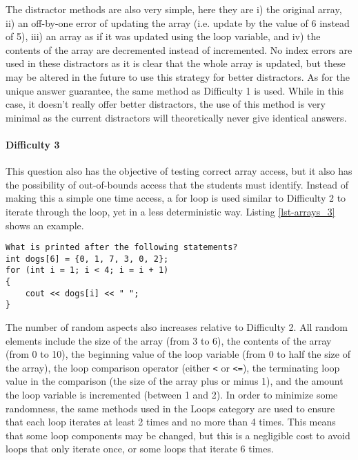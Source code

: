 \documentclass{article}
\begin{document}
The distractor methods are also very simple, here they are i) the original array, ii) an off-by-one error of updating the array (i.e. update by the value of 6 instead of 5), iii) an array as if it was
updated using the loop variable, and iv) the contents of the array are decremented instead of incremented. No index errors are used in these distractors as it is clear that the whole array is 
updated, but these may be altered in the future to use this strategy for better distractors. As for the unique answer guarantee, the same method as Difficulty 1 is used. While in this case, it
doesn't really offer better distractors, the use of this method is very minimal as the current distractors will theoretically never give identical answers. 

\paragraph{Difficulty 3} \hfill \par

This question also has the objective of testing correct array access, but it also has the possibility of out-of-bounds access that the students must identify. Instead of making this a simple one time
access, a for loop is used similar to Difficulty 2 to iterate through the loop, yet in a less deterministic way. Listing \ref{lst-arrays_3} shows an example.

\begin{lstlisting}[caption={\textbf{Arrays} Difficulty 3 Example}, label=lst-arrays_3]
What is printed after the following statements?
int dogs[6] = {0, 1, 7, 3, 0, 2}; 
for (int i = 1; i < 4; i = i + 1) 
{ 
	cout << dogs[i] << " ";
} 
\end{lstlisting}


The number of random aspects also increases relative to Difficulty 2. All random elements include the size of the array (from 3 to 6), the contents of the array (from 0 to 10), the beginning value
of the loop variable (from 0 to half the size of the array), the loop comparison operator (either \verb;<; or \verb;<=;), the terminating loop value in the comparison (the size of the array 
plus or minus 1), and the amount the loop variable is incremented (between 1 and 2). In order to minimize some randomness, the same methods used in the Loops category are used to ensure
that each loop iterates at least 2 times and no more than 4 times. This means that some loop components may be changed, but this is a negligible cost to avoid loops that only iterate once, or 
some loops that iterate 6 times.
\end{document}
